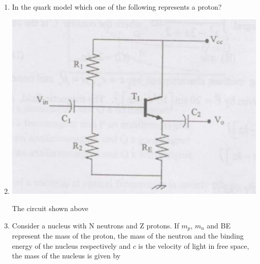 \documentclass[14pt, a4paper]{extarticle}
\begin{document}
\begin{enumerate}[label=\textbf{Q. \arabic*}]
\item In the quark model which one of the following represents a proton?
    \begin{enumerate}[label=(\Alph*)]
    \end{enumerate}

\item \parbox[t]{0.9\linewidth}{
    \begin{center}
        \includegraphics[width=0.6\columnwidth]{figs/Q19fig.png}
    \end{center}
    The circuit shown above
    \begin{enumerate}[label=(\Alph*)]
    \end{enumerate}
    }

\item Consider a nucleus with N neutrons and Z protons. If $m_p$, $m_n$ and BE represent the mass of the proton, the mass of the neutron and the binding energy of the nucleus respectively and $c$ is the velocity of light in free space, the mass of the nucleus is given by
    \begin{enumerate}[label=(\Alph*)]
    \end{enumerate}
\end{enumerate}
\end{document}

